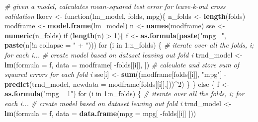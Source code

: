 \documentclass[]{article}
\newenvironment{Shaded}{\begin{snugshade}}{\end{snugshade}}
\newcommand{\KeywordTok}[1]{\textcolor[rgb]{0.13,0.29,0.53}{\textbf{{#1}}}}
\newcommand{\DataTypeTok}[1]{\textcolor[rgb]{0.13,0.29,0.53}{{#1}}}
\newcommand{\DecValTok}[1]{\textcolor[rgb]{0.00,0.00,0.81}{{#1}}}
\newcommand{\StringTok}[1]{\textcolor[rgb]{0.31,0.60,0.02}{{#1}}}
\newcommand{\CommentTok}[1]{\textcolor[rgb]{0.56,0.35,0.01}{\textit{{#1}}}}
\newcommand{\NormalTok}[1]{{#1}}
\begin{document}
\begin{Shaded}
\begin{Highlighting}[]
\CommentTok{# given a model, calculates mean-squared test error for leave-k-out cross validation}
\NormalTok{lkocv <-}\StringTok{ }\NormalTok{function(lm_model, folds, mpg)\{}
        \NormalTok{n_folds <-}\StringTok{ }\KeywordTok{length}\NormalTok{(folds)}
        \NormalTok{modframe <-}\StringTok{ }\KeywordTok{model.frame}\NormalTok{(lm_model)}
        \NormalTok{n <-}\StringTok{ }\KeywordTok{names}\NormalTok{(modframe)}
        \NormalTok{sse <-}\StringTok{ }\KeywordTok{numeric}\NormalTok{(n_folds)}
        \NormalTok{if (}\KeywordTok{length}\NormalTok{(n) >}\StringTok{ }\DecValTok{1}\NormalTok{)\{}
                \NormalTok{f <-}\StringTok{ }\KeywordTok{as.formula}\NormalTok{(}\KeywordTok{paste}\NormalTok{(}\StringTok{"mpg ~"}\NormalTok{, }\KeywordTok{paste}\NormalTok{(n[!n %
                                      \DataTypeTok{collapse =} \StringTok{" + "}\NormalTok{)))}
                \NormalTok{for (i in }\DecValTok{1}\NormalTok{:n_folds) \{}
                        \CommentTok{# iterate over all the folds, i; for each i...}
                        \CommentTok{# create model based on dataset leaving out fold i}
                        \NormalTok{trnd_model <-}\StringTok{ }\KeywordTok{lm}\NormalTok{(}\DataTypeTok{formula =} \NormalTok{f, }\DataTypeTok{data =} 
                                        \NormalTok{modframe[ -folds[[i]], ])}
                        \CommentTok{# calculate and store sum of squared errors for each fold i}
                        \NormalTok{sse[i] <-}\StringTok{ }\KeywordTok{sum}\NormalTok{((modframe[folds[[i]], }\StringTok{"mpg"}\NormalTok{] -}
\StringTok{                                        }\KeywordTok{predict}\NormalTok{(trnd_model, }\DataTypeTok{newdata =} 
                                                \NormalTok{modframe[folds[[i]],]))^}\DecValTok{2}\NormalTok{)}
                \NormalTok{\}}
                \NormalTok{\} else \{ }
                \NormalTok{f <-}\StringTok{ }\KeywordTok{as.formula}\NormalTok{(}\StringTok{"mpg ~ 1"}\NormalTok{)}
                \NormalTok{for (i in }\DecValTok{1}\NormalTok{:n_folds) \{}
                        \CommentTok{# iterate over all the folds, i; for each i...}
                        \CommentTok{# create model based on dataset leaving out fold i}
                        \NormalTok{trnd_model <-}\StringTok{ }\KeywordTok{lm}\NormalTok{(}\DataTypeTok{formula =} \NormalTok{f, }\DataTypeTok{data =} 
                                        \KeywordTok{data.frame}\NormalTok{(}\DataTypeTok{mpg =} \NormalTok{mpg[ -folds[[i]] ]))}
}
\end{Highlighting}
\end{Shaded}
\end{document}
